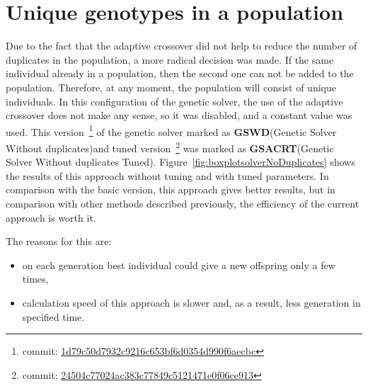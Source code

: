 \section{Unique genotypes in a population}
Due to the fact that the adaptive crossover did not help to reduce the number of duplicates in the population, a more radical decision was made. If the same individual already in a population, then the second one can not be added to the population. Therefore, at any moment, the population will consist of unique individuals. In this configuration of the genetic solver, the use of the adaptive crossover does not make any sense, so it was disabled, and a constant value was used.
This version~\footnote{commit: \href{https://git-st.inf.tu-dresden.de/mquat/mquat2/commit/1d79c50d7932c9216c653bf6d0354d990f6aecbc}{1d79c50d7932c9216c653bf6d0354d990f6aecbc}} of the genetic solver marked as \textbf{GSWD}(Genetic Solver Without duplicates)and tuned version~\footnote{commit: \href{https://git-st.inf.tu-dresden.de/mquat/mquat2/commit/24504c77024ac383c77849c5121471e0f06ce913}{24504c77024ac383c77849c5121471e0f06ce913}} was marked as \textbf{GSACRT}(Genetic Solver Without duplicates Tuned).
Figure~\ref{fig:boxplotsolverNoDuplicates} shows the results of this approach without tuning and with tuned parameters. In comparison with the basic version, this approach gives better results, but in comparison with other methods described previously, the efficiency of the current approach is worth it.

The reasons for this are:
\begin{itemize}
	\item on each generation best individual could give a new offspring only a few times, 
	\item calculation speed of this approach is slower and, as a result, less generation in specified time.
\end{itemize}


